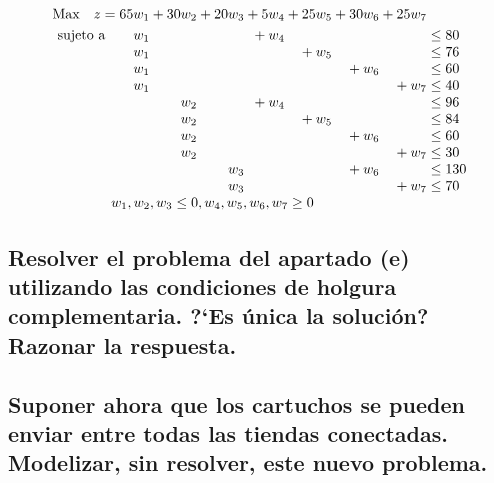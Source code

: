 \documentclass[10pt, a4paper]{article}
\begin{document}
			\[
			  \begin{array}{r@{}r@{}r@{}r@{}r@{}r@{}r@{}l}
			    \text{Max} \quad z = 65w_{1} &{} +30w_{2} &{} + 20w_{3} &{} + 5w_{4} &{} + 25w_{5} &{} + 30w_{6} &{} + 25w_{7} &{} \\[\jot]
			    \text{sujeto a}\qquad 	w_{1} &{} 		&{} 		&{} + w_{4} &{} &{} &{}  &{} \leq 80 \\
			                     		w_{1} &{} 		&{} 		&{} 		&{} + w_{5}&{} &{}  &{} \leq 76 \\
								 		w_{1} &{} 		&{} 		&{} 		&{} &{} + w_{6}&{}  &{} \leq 60 \\
								 		w_{1} &{} 		&{} 		&{} 		&{} &{} &{} + w_{7} &{} \leq 40  \\
								 		      &{} w_{2} &{} 		&{} + w_{4}	&{} &{} &{}  &{} \leq 96 \\
											  &{} w_{2} &{} 		&{} 		&{} + w_{5} &{} &{}  &{} \leq 84 \\
											  &{} w_{2} &{} 		&{} 		&{} &{} + w_{6}&{}  &{} \leq 60 \\
											  &{} w_{2} &{} 		&{} 		&{} &{} &{} + w_{7} &{} \leq 30 \\
											  &{} 		&{} w_{3} 	&{} 		&{} &{} + w_{6} &{}  &{} \leq 130 \\
											  &{} 		&{} w_{3} 	&{} 		&{} &{} &{} +w_{7} &{} \leq 70 \\
			     \multicolumn{6}{c}{w_{1}, w_{2}, w_{3} \leq 0, w_{4}, w_{5}, w_{6}, w_{7} \geq 0}


			  \end{array}
			\]

		\subsection{Resolver el problema del apartado (e) utilizando las condiciones de holgura complementaria. ?`Es única la solución? Razonar la respuesta.}

			\paragraph{}


		\subsection{Suponer ahora que los cartuchos se pueden enviar entre todas las tiendas conectadas. Modelizar, sin resolver, este nuevo problema.}

			\paragraph{}
\end{document}

